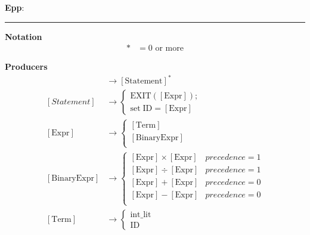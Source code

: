 \documentclass[11pt]{article}
\newcommand{\hwheadings}[3]{
{{\bf Epp}: \chapsec } \hfill {{ \yourname }} \hfill {{ \course #1}}
\rule[0.051in]{\textwidth}{0.0025in}
}
\begin{document}
\hwheadings{}{}{}

\textbf{Notation}
\begin{align*}
  * &= 0 \text{ or more}
\end{align*}


\textbf{Producers}
\begin{align*}
  [Prog] &\to [\text{Statement}]^* \\
  [Statement] &\to 
  \begin{cases}
    \text{EXIT}([\text{Expr}]); \\ 
    \text{set} \; \text{ID} = [\text{Expr}]
  \end{cases} \\
  [\text{Expr}] &\to 
  \begin{cases}
  [\text{Term}] \\ 
  [\text{BinaryExpr}] \\
  \end{cases} \\
  [\text{BinaryExpr}] &\to 
  \begin{cases}
    [\text{Expr}] \times [\text{Expr}] & precedence = 1 \\
    [\text{Expr}] \div [\text{Expr}] & precedence = 1\\
    [\text{Expr}] + [\text{Expr}] & precedence = 0\\
    [\text{Expr}] - [\text{Expr}] & precedence = 0\\
  \end{cases} \\
  [\text{Term}] &\to
  \begin{cases}
    \text{int\_lit} \\ 
    \text{ID}
  \end{cases}
\end{align*}
\end{document}
